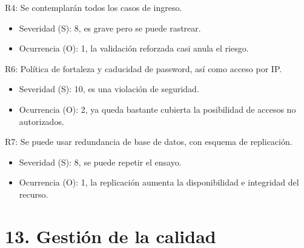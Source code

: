 \documentclass[11pt]{charter}
\begin{document}
R4: Se contemplarán todos los casos de ingreso.
\begin{itemize}
\item Severidad (S): 8, es grave pero se puede rastrear.
\item Ocurrencia (O): 1, la validación reforzada casi anula el riesgo.
\end{itemize}

R6: Política de fortaleza y caducidad de password, así como acceso por IP.
\begin{itemize}
\item Severidad (S): 10, es una violación de seguridad.
\item Ocurrencia (O): 2, ya queda bastante cubierta la posibilidad de accesos no autorizados.
\end{itemize}

R7: Se puede usar redundancia de base de datos, con esquema de replicación.
\begin{itemize}
\item Severidad (S): 8, se puede repetir el ensayo.
\item Ocurrencia (O): 1, la replicación aumenta la disponibilidad e integridad del recurso.
\end{itemize}


\section{13. Gestión de la calidad}
\label{sec:calidad}

\end{document}
